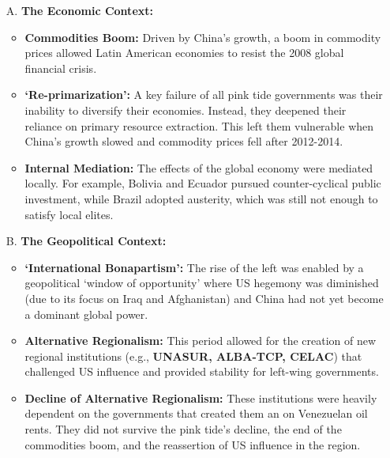 \documentclass{article}
\begin{document}
    \begin{itemize}
        \item [A.] \textbf{The Economic Context:}
        \begin{itemize}
            \item \textbf{Commodities Boom:} Driven by China's growth, a
            boom in commodity prices allowed Latin American economies to
            resist the 2008 global financial crisis.
            \item \textbf{`Re-primarization':} A key failure of all pink
            tide governments was their inability to diversify their
            economies. Instead, they deepened their reliance on primary
            resource extraction. This left them vulnerable when China's
            growth slowed and commodity prices fell after 2012-2014.
            \item \textbf{Internal Mediation:} The effects of the global
            economy were mediated locally. For example, Bolivia and Ecuador
            pursued counter-cyclical public investment, while Brazil adopted
            austerity, which was still not enough to satisfy local elites.
        \end{itemize}
        \item[B.] \textbf{The Geopolitical Context:}
        \begin{itemize}
            \item \textbf{`International Bonapartism':} The rise of the left
            was enabled by a geopolitical `window of opportunity' where US
            hegemony was diminished (due to its focus on Iraq and
            Afghanistan) and China had not yet become a dominant global power.
            \item \textbf{Alternative Regionalism:} This period allowed for
            the creation of new regional institutions (e.g.,
            \textbf{UNASUR, ALBA-TCP, CELAC}) that challenged US influence
            and provided stability for left-wing governments.
            \item \textbf{Decline of Alternative Regionalism:} These
            institutions were heavily dependent on the governments that
            created them an on Venezuelan oil rents. They did not survive
            the pink tide's decline, the end of the commodities boom, and
            the reassertion of US influence in the region.
        \end{itemize}
    \end{itemize}
\end{document}

